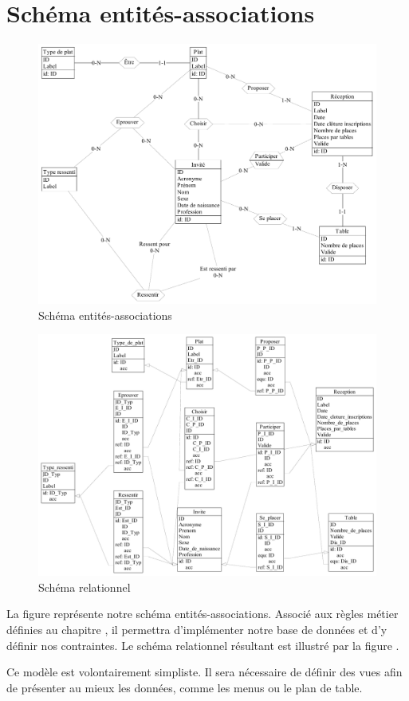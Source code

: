 \chapter{Schéma entités-associations}

\begin{figure}
  \centering
  \includegraphics[angle=90]{IMG/ea}
  \caption{Schéma entités-associations}
  \label{img_ea}
\end{figure}

\begin{figure}
  \centering
  \includegraphics[angle=90]{IMG/rel}
  \caption{Schéma relationnel}
  \label{img_rel}
\end{figure}

La figure  représente notre schéma entités-associations. Associé aux règles métier définies au chapitre , il permettra d'implémenter notre base de données et d'y définir nos contraintes. Le schéma relationnel résultant est illustré par la figure .

Ce modèle est volontairement simpliste. Il sera nécessaire de définir des vues afin de présenter au mieux les données, comme les menus ou le plan de table.